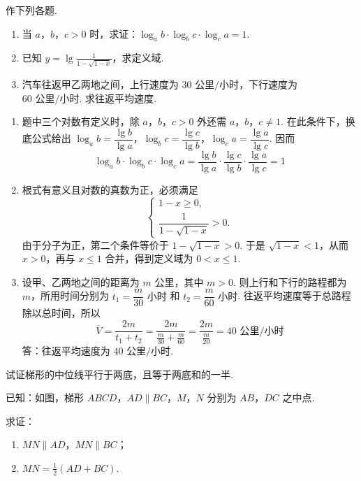 \begin{problem}
作下列各题.

\begin{enumerate}
\item 当 \(a\)，\(b\)，\(c>0\) 时，求证：\( \log_a b\cdot\log_b c\cdot\log_c a=1 \).

\item 已知 \( y=\lg \frac{1}{1-\sqrt{1-x}} \)，求定义域.

\item 汽车往返甲乙两地之间，上行速度为 \(30\text{ 公里/小时}\)，下行速度为 \(60\text{ 公里/小时}\). 求往返平均速度.
\end{enumerate}
\end{problem}

\begin{solution}
\begin{enumerate}
\item 题中三个对数有定义时，除 \(a\)，\(b\)，\(c>0\) 外还需 \(a\)，\(b\)，\(c\ne1\). 在此条件下，换底公式给出
\(\log_a b=\dfrac{\lg b}{\lg a}\)，\(\log_b c=\dfrac{\lg c}{\lg b}\)，\(\log_c a=\dfrac{\lg a}{\lg c}\). 因而
\[
\log_a b\cdot\log_b c\cdot\log_c a
=\frac{\lg b}{\lg a}\cdot\frac{\lg c}{\lg b}\cdot\frac{\lg a}{\lg c}=1
\]

\item 根式有意义且对数的真数为正，必须满足
\[
\begin{cases}
1-x\ge0,\\
\dfrac{1}{1-\sqrt{1-x}}>0.
\end{cases}
\]
由于分子为正，第二个条件等价于 \(1-\sqrt{1-x}>0\). 于是 \(\sqrt{1-x}<1\)，从而 \(x>0\)，再与 \(x\le1\) 合并，得到定义域为 \(0<x\le1\).

\item 设甲、乙两地之间的距离为 \(m\text{ 公里}\)，其中 \(m>0\). 则上行和下行的路程都为 \(m\)，所用时间分别为 \(t_1=\dfrac{m}{30}\text{ 小时}\) 和 \(t_2=\dfrac{m}{60}\text{ 小时}\). 往返平均速度等于总路程除以总时间，所以
\[
\overline{V}=\frac{2m}{t_1+t_2}=\frac{2m}{\frac{m}{30}+\frac{m}{60}}=\frac{2m}{\frac{m}{20}}=40\text{ 公里/小时}
\]
答：往返平均速度为 \(40\text{ 公里/小时}\).
\end{enumerate}
\end{solution}

\begin{problem}
试证梯形的中位线平行于两底，且等于两底和的一半.

已知：如图，梯形 \(ABCD\)，\( AD\parallel BC \)，\(M\)，\(N\) 分别为 \(AB\)，\(DC\) 之中点.

求证：

\begin{enumerate}
\item \(MN\parallel AD\)，\(MN\parallel BC\)；
\item \(MN=\frac{1}{2}(AD+BC)\).
\end{enumerate}

\begin{center}
\end{center}
\end{problem}

